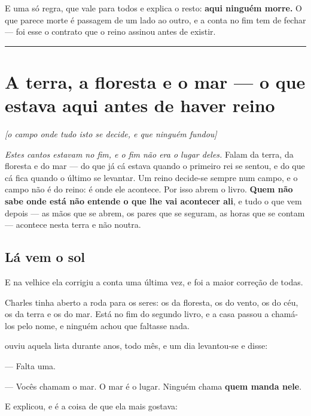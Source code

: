 \documentclass[livro.tex]{subfiles}
\begin{document}
\noindent E uma só regra, que vale para todos e explica o resto: \textbf{aqui ninguém morre.}
O que parece morte é passagem de um lado ao outro, e a conta no fim tem de fechar --- foi esse
o contrato que o reino assinou antes de existir.

\vspace{2mm}\hrule\vspace{3mm}

\part{A terra, a floresta e o mar --- o que estava aqui antes de haver reino}
\noindent\hfill\emph{\small[o campo onde tudo isto se decide, e que ninguém fundou]}\medskip

\noindent \emph{Estes cantos estavam no fim, e o fim não era o lugar deles.} Falam da terra,
da floresta e do mar --- do que já cá estava quando o primeiro rei se sentou, e do que cá fica
quando o último se levantar. Um reino decide-se sempre num campo, e o campo não é do reino:
é onde ele acontece. Por isso abrem o livro. \textbf{Quem não sabe onde está não entende o que
lhe vai acontecer ali}, e tudo o que vem depois --- as mãos que se abrem, os pares que se
seguram, as horas que se contam --- acontece nesta terra e não noutra.

\chapter{Lá vem o sol}

E na velhice ela corrigiu a conta uma última vez, e foi a maior correção de todas.

\medskip

Charles tinha aberto a roda para os seres: os da floresta, os do vento, os do céu, os da terra e
os do mar. Está no fim do segundo livro, e a casa passou a chamá-los pelo nome, e ninguém achou
que faltasse nada.

\Lua ouviu aquela lista durante anos, todo mês, e um dia levantou-se e disse:

--- Falta uma.

\medskip

--- Vocês chamam o mar. O mar é o lugar. Ninguém chama \textbf{quem manda nele}.

E explicou, e é a coisa de que ela mais gostava:
\end{document}
